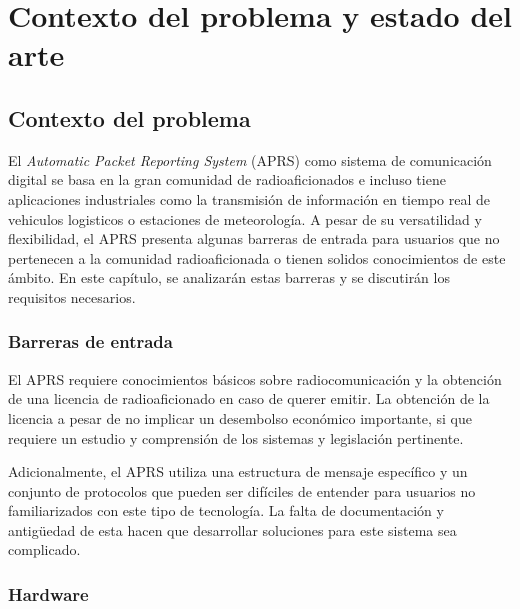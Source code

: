 \titlespacing*{\chapter}{0pt}{-1.25cm}{25pt}
\chapter{Contexto del problema y estado del arte}

\section{Contexto del problema}

El \textit{Automatic Packet Reporting System} (APRS) como sistema de comunicación digital se basa en la gran comunidad de radioaficionados e incluso tiene aplicaciones industriales como la transmisión de información en tiempo real de vehiculos logisticos o estaciones de meteorología. A pesar de su versatilidad y flexibilidad, el APRS presenta algunas barreras de entrada para usuarios que no pertenecen a la comunidad radioaficionada o tienen solidos conocimientos de este ámbito. En este capítulo, se analizarán estas barreras y se discutirán los requisitos necesarios.

\subsection{Barreras de entrada}

El APRS requiere conocimientos básicos sobre radiocomunicación y la obtención de una licencia de radioaficionado en caso de querer emitir. La obtención de la licencia a pesar de no implicar un desembolso económico importante, si que requiere un estudio y comprensión de los sistemas y legislación pertinente.

Adicionalmente, el APRS utiliza una estructura de mensaje específico y un conjunto de protocolos que pueden ser difíciles de entender para usuarios no familiarizados con este tipo de tecnología. La falta de documentación y antigüedad de esta hacen que desarrollar soluciones para este sistema sea complicado.

\subsection{Hardware}

